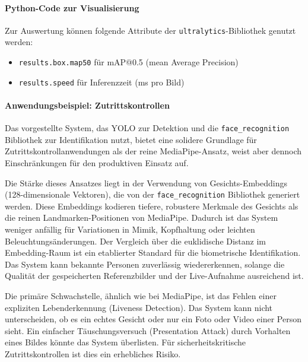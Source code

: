 \paragraph{Python-Code zur Visualisierung}

Zur Auswertung können folgende Attribute der \texttt{ultralytics}-Bibliothek genutzt werden:
\begin{itemize}
    \item \texttt{results.box.map50} für mAP@0.5 (mean Average Precision)
    \item \texttt{results.speed} für Inferenzzeit (ms pro Bild)
\end{itemize}

\paragraph{Anwendungsbeispiel: Zutrittskontrollen}

Das vorgestellte System, das YOLO zur Detektion und die \texttt{face\_recognition} Bibliothek zur Identifikation nutzt, bietet eine solidere Grundlage für Zutrittskontrollanwendungen als der reine MediaPipe-Ansatz, weist aber dennoch Einschränkungen für den produktiven Einsatz auf.

Die Stärke dieses Ansatzes liegt in der Verwendung von Gesichts-Embeddings (128-dimensionale Vektoren), die von der \texttt{face\_recognition} Bibliothek generiert werden. Diese Embeddings kodieren tiefere, robustere Merkmale des Gesichts als die reinen Landmarken-Positionen von MediaPipe. Dadurch ist das System weniger anfällig für Variationen in Mimik, Kopfhaltung oder leichten Beleuchtungsänderungen. Der Vergleich über die euklidische Distanz im Embedding-Raum ist ein etablierter Standard für die biometrische Identifikation. Das System kann bekannte Personen zuverlässig wiedererkennen, solange die Qualität der gespeicherten Referenzbilder und der Live-Aufnahme ausreichend ist.

Die primäre Schwachstelle, ähnlich wie bei MediaPipe, ist das Fehlen einer expliziten Lebenderkennung (Liveness Detection). Das System kann nicht unterscheiden, ob es ein echtes Gesicht oder nur ein Foto oder Video einer Person sieht. Ein einfacher Täuschungsversuch (Presentation Attack) durch Vorhalten eines Bildes könnte das System überlisten. Für sicherheitskritische Zutrittskontrollen ist dies ein erhebliches Risiko.

